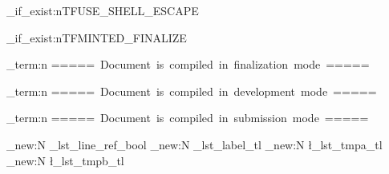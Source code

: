 
\usepackage[english]{babel}
\usepackage{metalogo}
\usepackage{tcolorbox}
\usepackage{booktabs}
\usepackage{microtype}
\usepackage{expl3}
\usepackage{mdframed}
\usepackage{chngcntr}
\usepackage{etoolbox}
\usepackage{adjustbox}
\usepackage{supertabular}
\usepackage{makecell}
\usepackage{tikz}
\usepackage{ragged2e}
\usepackage{float}
\usepackage{array}
\usepackage{xcolor}
\usepackage{datetime2}
\usepackage[scale=0.9]{tgheros}

\ExplSyntaxOn
\file_if_exist:nTF{USE_SHELL_ESCAPE}
{
    \file_if_exist:nTF{MINTED_FINALIZE}
    {
        \iow_term:n {=====~Document~is~compiled~in~finalization~mode~=====}
        \usepackage[finalizecache,cachedir={minted-frozen}]{minted}
    }
    {
        \iow_term:n {=====~Document~is~compiled~in~development~mode~=====}
        \usepackage{minted}
    }
}
{
    \iow_term:n {=====~Document~is~compiled~in~submission~mode~=====}
    \usepackage[frozencache,cachedir={minted-frozen}]{minted}
}
\ExplSyntaxOff


\usepackage[breaklinks]{hyperref}
\usepackage[capitalise]{cleveref}



\newcommand*{\LT}{\texorpdfstring{\LaTeX}{LaTeX}}
\newcommand*{\LTT}{\texorpdfstring{\LaTeX3}{LaTeX3}}
\let\liii\LTT

\renewcommand{\MintedPygmentize}{./my_pygmentize}

\newcommand{\ListOfCodeExampleName}{List of Examples}
\makeatletter
\newcommand{\ListOfCodeExample}{\section*{\ListOfCodeExampleName}\@starttoc{CodeExample}}
\makeatother


\makeatletter
\ExplSyntaxOn
\bool_new:N \g_lst_line_ref_bool
\tl_new:N \g_lst_label_tl
\tl_new:N \l_lst_tmpa_tl
\tl_new:N \l_lst_tmpb_tl


